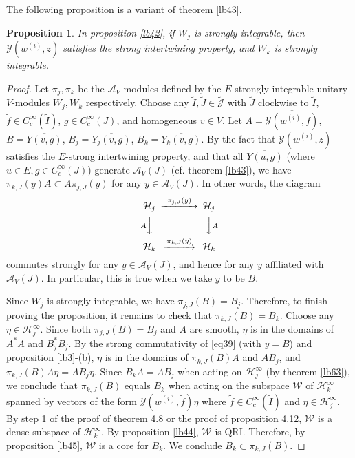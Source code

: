\documentclass[11pt,b5paper,notitlepage]{article}
\theoremstyle{definition}
\theoremstyle{plain}
\newtheorem{pp}[df]{Proposition}
\newcommand{\mc}{\mathcal}
\newcommand{\wtd}{\widetilde}
\newcommand{\ovl}{\overline}
\newcommand{\Jtd}{\widetilde{\mathcal J}}
\numberwithin{equation}{subsection}
\begin{document}
The following proposition is a variant of theorem \ref{lb43}.

\begin{pp}\label{lb47}
In proposition \ref{lb42}, if $W_j$ is strongly-integrable, then $\mc Y(w^{(i)},z)$ satisfies the strong intertwining property, and $W_k$ is strongly integrable. 
\end{pp}
\begin{proof}
Let $\pi_j,\pi_k$ be the $\mc A_V$-modules defined by the $E$-strongly integrable unitary $V$-modules $W_j,W_k$ respectively. Choose any $\wtd I,\wtd J\in\Jtd$ with $\wtd J$ clockwise to $\wtd I$, $\wtd f\in C_c^\infty(\wtd I)$, $g\in C_c^\infty(J)$, and homogeneous $v\in V$.  Let $A=\ovl{\mc Y(w^{(i)},f)}$, $B=\ovl{Y(v,g)}$, $B_j=\ovl{Y_j(v,g)}$, $B_k=\ovl{Y_k(v,g)}$.  By the fact that $\mc Y(w^{(i)},z)$ satisfies the $E$-strong intertwining property, and  that all $\ovl{Y(u,g)}$ (where $u\in E,g\in C_c^\infty(J)$) generate $\mc A_V(J)$ (cf. theorem \ref{lb43}), we have $\pi_{k,J}(y)A\subset A\pi_{j,J}(y)$ for any $y\in\mc A_V(J)$. In other words, the diagram
\begin{align}\label{eq39}
\begin{CD}
\mc H_j @>~\pi_{j,J}(y)~>> \mc H_j\\
@V A  VV @VV  A V\\
\mc H_k @> \pi_{k,J}(y)>> \mc H_k
\end{CD}
\end{align}
commutes strongly for any $y\in\mc A_V(J)$, and hence for any $y$ affiliated with $\mc A_V(J)$. In particular, this is true when we take $y$ to be $B$. 

Since $W_j$ is strongly integrable, we have $\pi_{j,J}(B)=B_j$. Therefore, to finish proving the proposition, it remains to check that $\pi_{k,J}(B)=B_k$. Choose any $\eta\in\mc H_j^\infty$. Since both $\pi_{j,J}(B)=B_j$ and $A$ are smooth, $\eta$ is in the domains of $A^*A$ and $B_j^*B_j$. By the strong commutativity of \eqref{eq39} (with $y=B$) and proposition \ref{lb3}-(b), $\eta$ is in the domains of $\pi_{k,J}(B)A$ and $AB_j$, and $\pi_{k,J}(B)A\eta=AB_j\eta$. Since $B_kA=AB_j$ when acting on $\mc H_j^\infty$ (by theorem \ref{lb63}), we conclude that $\pi_{k,J}(B)$ equals $B_k$ when acting on the subspace $\mc W$ of $\mc H_k^\infty$ spanned by vectors of the form $\mc Y(w^{(i)},\wtd f)\eta$ where $\wtd f\in C_c^\infty(\wtd I)$ and $\eta\in\mc H_j^\infty$. By step 1 of the proof of \cite{Gui19b} theorem 4.8 or the proof of \cite{Gui21a} proposition 4.12, $\mc W$ is a dense subspace of $\mc H_k^\infty$. By proposition \ref{lb44}, $\mc W$ is QRI. Therefore, by proposition \ref{lb45}, $\mc W$ is a core for $B_k$. We conclude $B_k\subset\pi_{k,J}(B)$. 


\end{proof}
\end{document}
